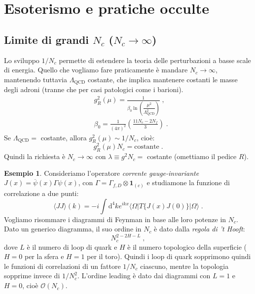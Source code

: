\documentclass[12pt,a4paper]{article}
\theoremstyle{definition}
\newtheorem{exm}{Esempio}
\newcommand{\diff}[1][]{\mathrm{d}#1}
\newcommand{\bra}{\langle}
\newcommand{\ket}{\rangle}
\numberwithin{equation}{section}
\begin{document}
\section{Esoterismo e pratiche occulte}
\subsection{Limite di grandi $N_c$ ($N_c\to\infty$)}
Lo sviluppo $1/N_c$ permette di estendere la teoria delle perturbazioni a basse scale di energia. Quello che vogliamo fare praticamente è mandare $N_c\to\infty$, mantenendo tuttavia $\Lambda_{\mathrm{QCD}}$ costante, che implica mantenere costanti le masse degli adroni (tranne che per casi patologici come i barioni).
\begin{align*}
&g_R^2(\mu)=\frac{1}{\beta_0\ln\left(\dfrac{\mu^2}{\Lambda^2_{\mathrm{QCD}}}\right)}\;, \\
&\beta_0=\frac{1}{(4\pi)^2}\left(\frac{11N_c-2N_f}{3}\right)\;.
\end{align*}
Se $\Lambda_{\mathrm{QCD}}=$ costante, allora $g_R^2(\mu)\sim 1/N_c$, cioè:
\begin{equation}
\boxed{
g_R^2(\mu)N_c=\mbox{costante}
}\;.
\end{equation}
Quindi la richiesta è $N_c\to\infty$ con $\lambda\equiv g^2N_c=$ costante (omettiamo il pedice $R$). \\
\begin{exm} 
Consideriamo l'operatore \emph{corrente gauge-invariante} $J(x)=\overline{\psi}(x)\Gamma\psi(x)$, con $\Gamma=\Gamma_{f,D}\otimes\mathbf{1}_{(c)}$ e studiamone la funzione di correlazione a due punti:
\begin{equation}
\bra JJ\ket(k)=-i\int\diff^4{k}e^{ikx}\bra\Omega|T\{J(x)J(0)\}|\Omega\ket\;.
\end{equation}
Vogliamo risommare i diagrammi di Feynman in base alle loro potenze in $N_c$. Dato un generico diagramma, il suo ordine in $N_c$ è dato dalla \emph{regola di 't Hooft}:
\begin{equation}
\boxed{
N_c^{2-2H-L}
}\;,
\end{equation}
dove $L$ è il numero di loop di quark e $H$ è il numero topologico della superficie ($H=0$ per la sfera e $H=1$ per il toro). Quindi i loop di quark sopprimono quindi le funzioni di correlazioni di un fattore $1/N_c$ ciascuno, mentre la topologia sopprime invece di $1/N_c^2$. L'ordine leading è dato dai diagrammi con $L=1$ e $H=0$, cioè $\mathcal{O}(N_c)$.
\end{exm}
\end{document}
